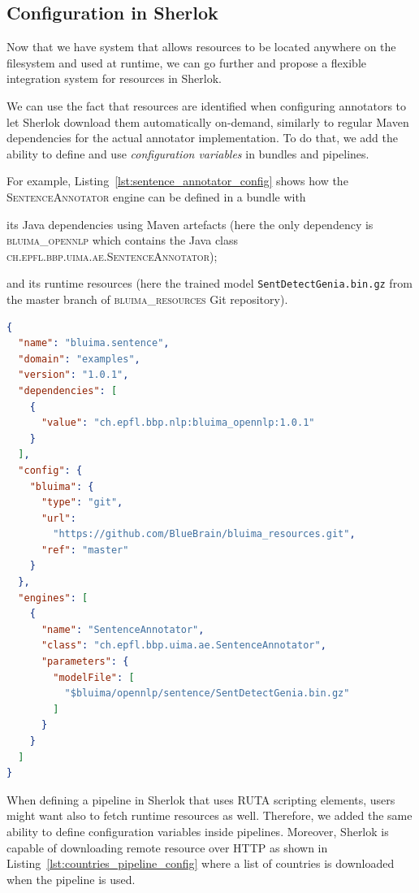 \documentclass{article}
\newcommand{\ID}[1]{{\textsc{#1}}}
\newcommand{\PATH}[1]{\mbox{\texttt{#1}}}
\begin{document}
\subsection{Configuration in Sherlok}
\label{sec:config_in_sherlok}

Now that we have system that allows resources to be located anywhere on the filesystem and used at
runtime, we can go further and propose a flexible integration system for resources in Sherlok.

We can use the fact that resources are identified when configuring annotators to let Sherlok
download them automatically on-demand, similarly to regular Maven dependencies for the actual
annotator implementation. To do that, we add the ability to define and use \emph{configuration
variables} in bundles and pipelines.

For example, Listing~\ref{lst:sentence_annotator_config} shows how the \ID{SentenceAnnotator} engine
can be defined in a bundle with
\begin{enumerate*}[label=\itshape\alph*\upshape)]
    \item its Java dependencies using Maven artefacts (here the only dependency is
        \ID{bluima\_opennlp} which contains the Java class \ID{ch.epfl.bbp.uima.ae.SentenceAnnotator});
    \item and its runtime resources (here the trained model \PATH{SentDetectGenia.bin.gz} from the
        master branch of \ID{bluima\_resources} Git repository).
\end{enumerate*}

\begin{lstlisting}[float,language=json,
                   caption=Configuration of \ID{SentenceAnnotator} in a Sherlok bundle.,
                   label=lst:sentence_annotator_config]
{
  "name": "bluima.sentence",
  "domain": "examples",
  "version": "1.0.1",
  "dependencies": [
    {
      "value": "ch.epfl.bbp.nlp:bluima_opennlp:1.0.1"
    }
  ],
  "config": {
    "bluima": {
      "type": "git",
      "url":
        "https://github.com/BlueBrain/bluima_resources.git",
      "ref": "master"
    }
  },
  "engines": [
    {
      "name": "SentenceAnnotator",
      "class": "ch.epfl.bbp.uima.ae.SentenceAnnotator",
      "parameters": {
        "modelFile": [
          "$bluima/opennlp/sentence/SentDetectGenia.bin.gz"
        ]
      }
    }
  ]
}
\end{lstlisting}

When defining a pipeline in Sherlok that uses RUTA scripting elements, users might want also to
fetch runtime resources as well. Therefore, we added the same ability to define configuration
variables inside pipelines. Moreover, Sherlok is capable of downloading remote resource over HTTP as
shown in Listing~\ref{lst:countries_pipeline_config} where a list of countries is downloaded when
the pipeline is used.
\end{document}
